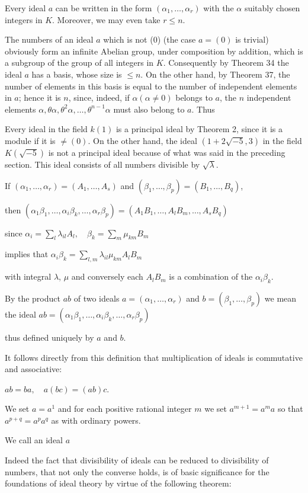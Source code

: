 Every ideal $a$ can be written in the form $(\alpha_1, \ldots, \alpha_r)$ with the $\alpha$ suitably chosen integers in $K$. Moreover, we may even take $r \leq n$.

The numbers of an ideal $a$ which is not (0) (the case $a = (0)$ is trivial) obviously form an infinite Abelian group, under composition by addition, which is a subgroup of the group of all integers in $K$. Consequently by Theorem 34 the ideal $a$ has a basis, whose size is $\leq n$. On the other hand, by Theorem 37, the number of elements in this basis is equal to the number of independent elements in $a$; hence it is $n$, since, indeed, if $\alpha (\alpha \neq 0)$ belongs to $a$, the $n$ independent elements $\alpha, \theta\alpha, \theta^2\alpha, \ldots, \theta^{n-1}\alpha$ must also belong to $a$. Thus

Every ideal in the field $k(1)$ is a principal ideal by Theorem 2, since it is a module if it is $\neq (0)$. On the other hand, the ideal $(1 + 2\sqrt{-5}, 3)$ in the field $K(\sqrt{-5})$ is not a principal ideal because of what was said in the preceding section. This ideal consists of all numbers divisible by $\sqrt{\lambda}$.

If
$(\alpha_1, \ldots, \alpha_r) = (A_1, \ldots, A_s)$ and $(\beta_1, \ldots, \beta_p) = (B_1, \ldots, B_q)$,

then
$(\alpha_1\beta_1, \ldots, \alpha_i\beta_k, \ldots, \alpha_r\beta_p) = (A_1B_1, \ldots, A_lB_m, \ldots, A_sB_q)$

since
$\alpha_i = \sum_l \lambda_{il}A_l, \quad \beta_k = \sum_m \mu_{km}B_m$

implies that
$\alpha_i\beta_k = \sum_{l,m} \lambda_{il}\mu_{km}A_lB_m$

with integral $\lambda$, $\mu$ and conversely each $A_lB_m$ is a combination of the $\alpha_i\beta_k$.

By the product $ab$ of two ideals $a = (\alpha_1, \ldots, \alpha_r)$ and $b = (\beta_1, \ldots, \beta_p)$ we mean the ideal
$ab = (\alpha_1\beta_1, \ldots, \alpha_i\beta_k, \ldots, \alpha_r\beta_p)$

thus defined uniquely by $a$ and $b$.

It follows directly from this definition that multiplication of ideals is commutative and associative:

$ab = ba, \quad a(bc) = (ab)c$.

We set $a = a^1$ and for each positive rational integer $m$ we set $a^{m+1} = a^m a$ so that $a^{p+q} = a^p a^q$ as with ordinary powers.

We call an ideal $a$

Indeed the fact that divisibility of ideals can be reduced to divisibility of numbers, that not only the converse holds, is of basic significance for the foundations of ideal theory by virtue of the following theorem:
